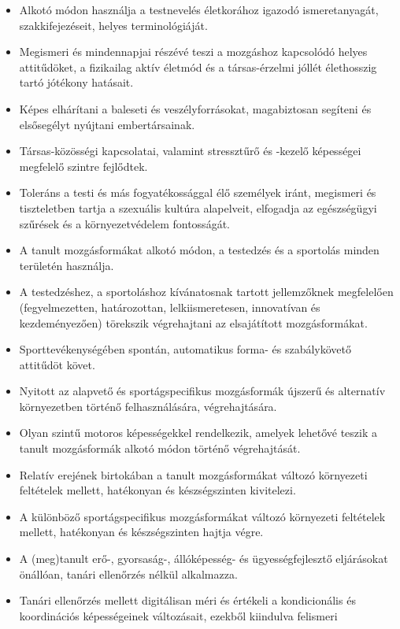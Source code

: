 \begin{itemize}
\item
  Alkotó módon használja a testnevelés életkorához igazodó
  ismeretanyagát, szakkifejezéseit, helyes terminológiáját.
\item
  Megismeri és mindennapjai részévé teszi a mozgáshoz kapcsolódó helyes
  attitűdöket, a fizikailag aktív életmód és a társas-érzelmi jóllét
  élethosszig tartó jótékony hatásait.
\item
  Képes elhárítani a baleseti és veszélyforrásokat, magabiztosan
  segíteni és elsősegélyt nyújtani embertársainak.
\item
  Társas-közösségi kapcsolatai, valamint stressztűrő és -kezelő
  képességei megfelelő szintre fejlődtek.
\item
  Toleráns a testi és más fogyatékossággal élő személyek iránt,
  megismeri és tiszteletben tartja a szexuális kultúra alapelveit,
  elfogadja az egészségügyi szűrések és a környezetvédelem fontosságát.
\item
  A tanult mozgásformákat alkotó módon, a testedzés és a sportolás
  minden területén használja.
\item
  A testedzéshez, a sportoláshoz kívánatosnak tartott jellemzőknek
  megfelelően (fegyelmezetten, határozottan, lelkiismeretesen,
  innovatívan és kezdeményezően) törekszik végrehajtani az elsajátított
  mozgásformákat.
\item
  Sporttevékenységében spontán, automatikus forma- és szabálykövető
  attitűdöt követ.
\item
  Nyitott az alapvető és sportágspecifikus mozgásformák újszerű és
  alternatív környezetben történő felhasználására, végrehajtására.
\item
  Olyan szintű motoros képességekkel rendelkezik, amelyek lehetővé
  teszik a tanult mozgásformák alkotó módon történő végrehajtását.
\item
  Relatív erejének birtokában a tanult mozgásformákat változó környezeti
  feltételek mellett, hatékonyan és készségszinten kivitelezi.
\item
  A különböző sportágspecifikus mozgásformákat változó környezeti
  feltételek mellett, hatékonyan és készségszinten hajtja végre.
\item
  A (meg)tanult erő-, gyorsaság-, állóképesség- és ügyességfejlesztő
  eljárásokat önállóan, tanári ellenőrzés nélkül alkalmazza.
\item
  Tanári ellenőrzés mellett digitálisan méri és értékeli a kondicionális
  és koordinációs képességeinek változásait, ezekből kiindulva felismeri

\end{itemize}
